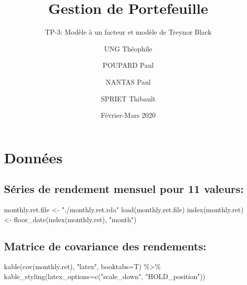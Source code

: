 \documentclass[
]{article}
\title{Gestion de Portefeuille}
\subtitle{TP-3: Modèle à un facteur et modèle de Treynor Black}
\author{UNG Théophile \and POUPARD Paul \and NANTAS Paul \and SPRIET
Thibault}
\date{Février-Mars 2020}
\newenvironment{Shaded}{\begin{snugshade}}{\end{snugshade}}
\newcommand{\AttributeTok}[1]{\textcolor[rgb]{0.77,0.63,0.00}{#1}}
\newcommand{\FunctionTok}[1]{\textcolor[rgb]{0.00,0.00,0.00}{#1}}
\newcommand{\NormalTok}[1]{#1}
\newcommand{\OtherTok}[1]{\textcolor[rgb]{0.56,0.35,0.01}{#1}}
\newcommand{\SpecialCharTok}[1]{\textcolor[rgb]{0.00,0.00,0.00}{#1}}
\newcommand{\StringTok}[1]{\textcolor[rgb]{0.31,0.60,0.02}{#1}}
\begin{document}
\maketitle

\hypertarget{donnuxe9es}{%
\section{Données}\label{donnuxe9es}}

\hypertarget{suxe9ries-de-rendement-mensuel-pour-11-valeurs}{%
\subsection{Séries de rendement mensuel pour 11
valeurs:}\label{suxe9ries-de-rendement-mensuel-pour-11-valeurs}}

\begin{Shaded}
\begin{Highlighting}[]
\NormalTok{monthly.ret.file }\OtherTok{\textless{}{-}} \StringTok{"./monthly.ret.rda"}
\FunctionTok{load}\NormalTok{(monthly.ret.file)}
\FunctionTok{index}\NormalTok{(monthly.ret) }\OtherTok{\textless{}{-}} \FunctionTok{floor\_date}\NormalTok{(}\FunctionTok{index}\NormalTok{(monthly.ret), }\StringTok{"month"}\NormalTok{)}
\end{Highlighting}
\end{Shaded}

\hypertarget{matrice-de-covariance-des-rendements}{%
\subsection{Matrice de covariance des
rendements:}\label{matrice-de-covariance-des-rendements}}

\begin{Shaded}
\begin{Highlighting}[]
\FunctionTok{kable}\NormalTok{(}\FunctionTok{cov}\NormalTok{(monthly.ret), }\StringTok{"latex"}\NormalTok{, }\AttributeTok{booktabs=}\NormalTok{T) }\SpecialCharTok{\%\textgreater{}\%}
\FunctionTok{kable\_styling}\NormalTok{(}\AttributeTok{latex\_options=}\FunctionTok{c}\NormalTok{(}\StringTok{"scale\_down"}\NormalTok{, }\StringTok{"HOLD\_position"}\NormalTok{))}
\end{Highlighting}
\end{Shaded}
\end{document}
